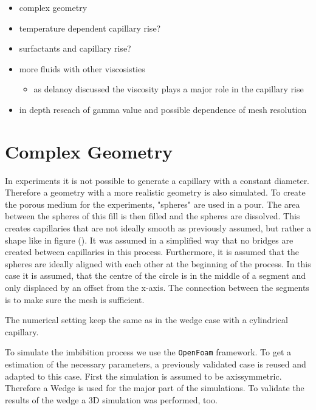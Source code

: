 \begin{itemize}
    \item complex geometry
    \item temperature dependent capillary rise?
    \item surfactants and capillary rise?
    \item more fluids with other viscosisties
    \begin{itemize}
        \item as delanoy discussed the viscosity plays a major role in the capillary rise
    \end{itemize}
    \item in depth reseach of gamma value and possible dependence of mesh resolution
\end{itemize}



\section{Complex Geometry}
In experiments it is not possible to generate a capillary with a constant diameter. Therefore a geometry with a more realistic geometry is also simulated. To create the porous medium for the experiments, "spheres" are used in a pour. The area between the spheres of this fill is then filled and the spheres are dissolved. This creates capillaries that are not ideally smooth as previously assumed, but rather a shape like in figure (). It was assumed in a simplified way that no bridges are created between capillaries in this process. Furthermore, it is assumed that the spheres are ideally aligned with each other at the beginning of the process.   
In this case it is assumed, that the centre of the circle is in the middle of a segment and only displaced by an offset from the x-axis. The connection between the segments is to make sure the mesh is sufficient. 

The numerical setting keep the same as in the wedge case with a cylindrical capillary. 


To simulate the imbibition process we use the \verb|OpenFoam| framework. To get a estimation of the necessary parameters, a previously validated case is reused and adapted to this case. First the simulation is assumed to be axissymmetric. Therefore a Wedge is used for the major part of the simulations. To validate the results of the wedge a 3D simulation was performed, too. 

